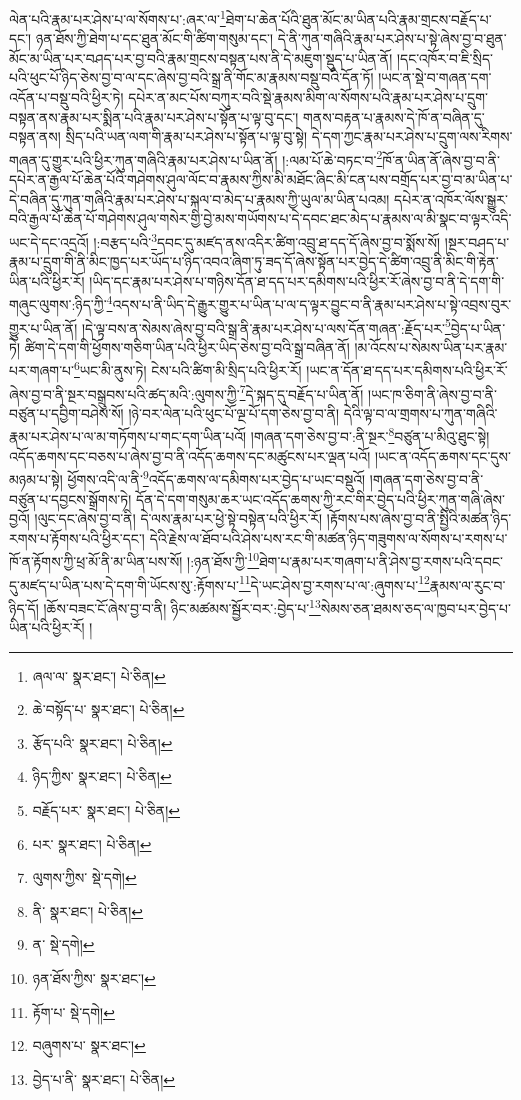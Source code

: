 ལེན་པའི་རྣམ་པར་ཤེས་པ་ལ་སོགས་པ་:ཞར་ལ་\footnote{ཞལ་ལ་  སྣར་ཐང་།  པེ་ཅིན། }ཐེག་པ་ཆེན་པོའི་ཐུན་མོང་མ་ཡིན་པའི་རྣམ་གྲངས་བརྗོད་པ་དང་། ཉན་ཐོས་ཀྱི་ཐེག་པ་དང་ཐུན་མོང་གི་ཚིག་གསུམ་དང་། དེ་ནི་ཀུན་གཞིའི་རྣམ་པར་ཤེས་པ་སྟེ་ཞེས་བྱ་བ་ཐུན་མོང་མ་ཡིན་པར་བཤད་པར་བྱ་བའི་རྣམ་གྲངས་བསྟན་པས་ནི་དེ་མཇུག་སྡུད་པ་ཡིན་ནོ། །དང་འཁོར་བ་ཇི་སྲིད་པའི་ཕུང་པོ་ཉིད་ཅེས་བྱ་བ་ལ་དང་ཞེས་བྱ་བའི་སྒྲ་ནི་གོང་མ་རྣམས་བསྡུ་བའི་དོན་ཏོ། །ཡང་ན་སྡེ་བ་གཞན་དག་འདོན་པ་བསྡུ་བའི་ཕྱིར་ཏེ། དཔེར་ན་མང་པོས་བཀུར་བའི་སྡེ་རྣམས་མིག་ལ་སོགས་པའི་རྣམ་པར་ཤེས་པ་དྲུག་བསྟན་ནས་རྣམ་པར་སྨིན་པའི་རྣམ་པར་ཤེས་པ་སྟོན་པ་ལྟ་བུ་དང་། གནས་བརྟན་པ་རྣམས་དེ་ཁོ་ན་བཞིན་དུ་བསྟན་ནས། སྲིད་པའི་ཡན་ལག་གི་རྣམ་པར་ཤེས་པ་སྟོན་པ་ལྟ་བུ་སྟེ། དེ་དག་ཀྱང་རྣམ་པར་ཤེས་པ་དྲུག་ལས་རིགས་གཞན་དུ་གྱུར་པའི་ཕྱིར་ཀུན་གཞིའི་རྣམ་པར་ཤེས་པ་ཡིན་ནོ། །:ལམ་པོ་ཆེ་བཏང་བ་\footnote{ཆེ་བསྟོད་པ་  སྣར་ཐང་།  པེ་ཅིན། }ཁོ་ན་ཡིན་ནོ་ཞེས་བྱ་བ་ནི་དཔེར་ན་རྒྱལ་པོ་ཆེན་པོའི་གཤེགས་ཤུལ་ལོང་བ་རྣམས་ཀྱིས་མི་མཐོང་ཞིང་མི་ངན་པས་བགྲོད་པར་བྱ་བ་མ་ཡིན་པ་དེ་བཞིན་དུ་ཀུན་གཞིའི་རྣམ་པར་ཤེས་པ་སྐལ་བ་མེད་པ་རྣམས་ཀྱི་ཡུལ་མ་ཡིན་པའམ། དཔེར་ན་འཁོར་ལོས་སྒྱུར་བའི་རྒྱལ་པོ་ཆེན་པོ་གཤེགས་ཤུལ་གསེར་གྱི་བྱེ་མས་གཡོགས་པ་དེ་དབང་ཐང་མེད་པ་རྣམས་ལ་མི་སྣང་བ་ལྟར་འདི་ཡང་དེ་དང་འདྲའོ། །:བརྩད་པའི་\footnote{རྩོད་པའི་  སྣར་ཐང་།  པེ་ཅིན། }དབང་དུ་མཛད་ནས་འདིར་ཚིག་འབྲུ་ཐ་དད་དོ་ཞེས་བྱ་བ་སྨོས་སོ། །སྔར་བཤད་པ་རྣམ་པ་དྲུག་གི་ནི་མིང་ཁྱད་པར་ཡོད་པ་ཉིད་འབའ་ཞིག་ཏུ་ཟད་དོ་ཞེས་སྟོན་པར་བྱེད་དེ་ཚིག་འབྲུ་ནི་མིང་གི་རྟེན་ཡིན་པའི་ཕྱིར་རོ། །ཡིད་དང་རྣམ་པར་ཤེས་པ་གཉིས་དོན་ཐ་དད་པར་དམིགས་པའི་ཕྱིར་རོ་ཞེས་བྱ་བ་ནི་དེ་དག་གི་གཞུང་ལུགས་:ཉིད་ཀྱི་\footnote{ཉིད་ཀྱིས་  སྣར་ཐང་།  པེ་ཅིན། }འདས་པ་ནི་ཡིད་དེ་རྒྱུར་གྱུར་པ་ཡིན་པ་ལ་ད་ལྟར་བྱུང་བ་ནི་རྣམ་པར་ཤེས་པ་སྟེ་འབྲས་བུར་གྱུར་པ་ཡིན་ནོ། །དེ་ལྟ་བས་ན་སེམས་ཞེས་བྱ་བའི་སྒྲ་ནི་རྣམ་པར་ཤེས་པ་ལས་དོན་གཞན་:རྗོད་པར་\footnote{བརྗོད་པར་  སྣར་ཐང་།  པེ་ཅིན། }བྱེད་པ་ཡིན་ཏེ། ཚིག་དེ་དག་གི་ཕྱོགས་གཅིག་ཡིན་པའི་ཕྱིར་ཡིད་ཅེས་བྱ་བའི་སྒྲ་བཞིན་ནོ། །མ་འོངས་པ་སེམས་ཡིན་པར་རྣམ་པར་གཞག་པ་\footnote{པར་  སྣར་ཐང་།  པེ་ཅིན། }ཡང་མི་ནུས་ཏེ། ངེས་པའི་ཚིག་མི་སྲིད་པའི་ཕྱིར་རོ། །ཡང་ན་དོན་ཐ་དད་པར་དམིགས་པའི་ཕྱིར་རོ་ཞེས་བྱ་བ་ནི་སྔར་བསྒྲུབས་པའི་ཚད་མའི་:ལུགས་ཀྱི་\footnote{ལུགས་ཀྱིས་  སྡེ་དགེ། }དེ་སྐད་དུ་བརྗོད་པ་ཡིན་ནོ། །ཡང་ཁ་ཅིག་ནི་ཞེས་བྱ་བ་ནི་བཙུན་པ་དབྱིག་བཤེས་སོ། །ཉེ་བར་ལེན་པའི་ཕུང་པོ་ལྔ་པོ་དག་ཅེས་བྱ་བ་ནི། དེའི་ལྟ་བ་ལ་གྲགས་པ་ཀུན་གཞིའི་རྣམ་པར་ཤེས་པ་ལ་མ་གཏོགས་པ་གང་དག་ཡིན་པའོ། །གཞན་དག་ཅེས་བྱ་བ་:ནི་སྔར་\footnote{ནི་  སྣར་ཐང་།  པེ་ཅིན། }བཙུན་པ་མིའུ་ཐུང་སྟེ། འདོད་ཆགས་དང་བཅས་པ་ཞེས་བྱ་བ་ནི་འདོད་ཆགས་དང་མཚུངས་པར་ལྡན་པའོ། །ཡང་ན་འདོད་ཆགས་དང་དུས་མཉམ་པ་སྟེ། ཕྱོགས་འདི་ལ་ནི་\footnote{ན་  སྡེ་དགེ། }འདོད་ཆགས་ལ་དམིགས་པར་བྱེད་པ་ཡང་བསྡུའོ། །གཞན་དག་ཅེས་བྱ་བ་ནི་བཙུན་པ་དབྱངས་སྒྲོགས་ཏེ། དོན་དེ་དག་གསུམ་ཆར་ཡང་འདོད་ཆགས་ཀྱི་རང་གིར་བྱེད་པའི་ཕྱིར་ཀུན་གཞི་ཞེས་བྱའོ། །ལུང་དང་ཞེས་བྱ་བ་ནི། དེ་ལས་རྣམ་པར་ཕྱེ་སྟེ་བསྟེན་པའི་ཕྱིར་རོ། །རྟོགས་པས་ཞེས་བྱ་བ་ནི་སྤྱིའི་མཚན་ཉིད་རགས་པ་རྟོགས་པའི་ཕྱིར་དང་། དེའི་རྗེས་ལ་ཐོབ་པའི་ཤེས་པས་རང་གི་མཚན་ཉིད་གཟུགས་ལ་སོགས་པ་རགས་པ་ཁོ་ན་རྟོགས་ཀྱི་ཕྲ་མོ་ནི་མ་ཡིན་པས་སོ། །:ཉན་ཐོས་ཀྱི་\footnote{ཉན་ཐོས་ཀྱིས་  སྣར་ཐང་། }ཐེག་པ་རྣམ་པར་གཞག་པ་ནི་ཤེས་བྱ་རགས་པའི་དབང་དུ་མཛད་པ་ཡིན་པས་དེ་དག་གི་ཡོངས་སུ་:རྟོགས་པ་\footnote{རྟོག་པ་  སྡེ་དགེ། }དེ་ཡང་ཤེས་བྱ་རགས་པ་ལ་:ཞུགས་པ་\footnote{བཞུགས་པ་  སྣར་ཐང་། }རྣམས་ལ་རུང་བ་ཉིད་དོ། །ཆོས་བཟང་ངོ་ཞེས་བྱ་བ་ནི། ཉིང་མཚམས་སྦྱོར་བར་:བྱེད་པ་\footnote{བྱེད་པ་ནི་  སྣར་ཐང་།  པེ་ཅིན། }སེམས་ཅན་ཐམས་ཅད་ལ་ཁྱབ་པར་བྱེད་པ་ཡིན་པའི་ཕྱིར་རོ། །
